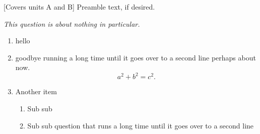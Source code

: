 \documentclass{ouab}
\begin{document}
\maketitle

%
%
%
%
%
%
%

[Covers units A and B]
Preamble text, if desired.

\emph{This question is about nothing in particular.}
\begin{enumerate}
\item hello
\item goodbye running a long time until it goes over to a second line perhaps about now.
\[ a^2 + b^2 = c^2.\]
\item Another item
\begin{enumerate}
\item Sub sub
\item Sub sub question that runs a long time until it goes over to a second line
\end{enumerate}
\end{enumerate}
\end{document}
